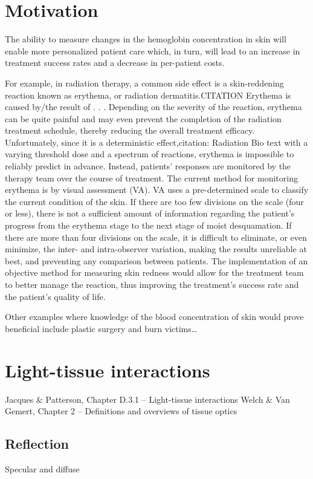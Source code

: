 \section{Motivation}
The ability to measure changes in the hemoglobin concentration in skin will enable more personalized patient care which, in turn, will lead to an increase in treatment success rates and a decrease in per-patient costs.

For example, in radiation therapy, a common side effect is a skin-reddening reaction known as erythema, or radiation dermatitis.CITATION Erythema is caused by/the result of . . . Depending on the severity of the reaction, erythema can be quite painful and may even prevent the completion of the radiation treatment schedule, thereby reducing the overall treatment efficacy. Unfortunately, since it is a deterministic effect,{citation: Radiation Bio text} with a varying threshold dose and a spectrum of reactions, erythema is impossible to reliably predict in advance. Instead, patients’ responses are monitored by the therapy team over the course of treatment. The current method for monitoring erythema is by visual assessment (VA). VA uses a pre-determined scale to classify the current condition of the skin. If there are too few divisions on the scale (four or less), there is not a sufficient amount of information regarding the patient’s progress from the erythema stage to the next stage of moist desquamation. If there are more than four divisions on the scale, it is difficult to eliminate, or even minimize, the inter- and intra-observer variation, making the results unreliable at best, and preventing any comparison between patients. The implementation of an objective method for measuring skin redness would allow for the treatment team to better manage the reaction, thus improving the treatment’s success rate and the patient’s quality of life.

Other examples where knowledge of the blood concentration of skin would prove beneficial include plastic surgery and burn victims…

\section{Light-tissue interactions}
Jacques \& Patterson, Chapter D.3.1 – Light-tissue interactions
Welch \& Van Gemert, Chapter 2 – Definitions and overviews of tissue optics

\subsection{Reflection}
Specular and diffuse

